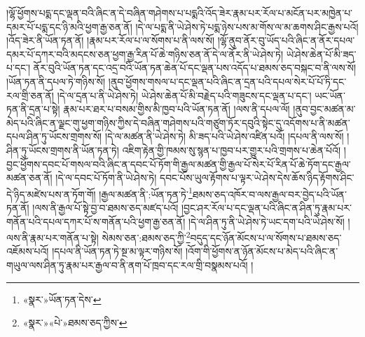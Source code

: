 །ལྷོ་ཕྱོགས་པདྨ་དང་ལྡན་བའི་ཞིང་ན་དེ་བཞིན་གཤེགས་པ་པདྨའི་འོད་ཟེར་རྣམ་པར་རོལ་པ་མངོན་པར་མཁྱེན་པ་དམར་པོ་པདྨ་དང་ཉི་མའི་ཕྱག་རྒྱ་ཅན་ནོ། །དེ་ལ་པདྨ་ནི་ཡེ་ཤེས་ཏེ་པདྨ་ཉེས་པས་མ་གོས་ལ་མ་ཆགས་ཤིང་རྒྱས་པའོ། །འོད་ཟེར་ནི་ཡོན་ཏན་ནོ། །རྣམ་པར་རོལ་པ་ལ་སོགས་པ་ནི་ལས་སོ། །ལྷོ་ནུབ་ནོར་བུ་ཡོད་པའི་ཞིང་ན་ནོར་དཔལ་དམར་པོ་དཀར་བའི་མདངས་ཅན་ཕྱག་རྒྱ་རིན་པོ་ཆེ་གཉིས་ཅན་ནོ་དེ་ལ་ནོར་ནི་ཡེ་ཤེས་ཏེ། ཡེ་ཤེས་ཆེན་པོ་མི་ཟད་པ་དང་། ནོར་བུའི་ཡོན་ཏན་དང་འདྲ་བའི་ཡོན་ཏན་ཆེན་པོ་དང་ལྡན་པས་འདོད་པ་ཐམས་ཅད་བསྐང་བ་ནི་ལས་སོ། །ཡོན་ཏན་ནི་དཔལ་ཏེ་གཉིས་སོ། །ནུབ་ཕྱོགས་གསལ་པ་དང་ལྡན་པའི་ཞིང་ན་དྲན་པའི་དཔལ་སེར་པོ་པོ་ཏི་དང་རལ་གྲི་ཅན་ནོ། །དེ་ལ་དྲན་པ་ནི་ཡེ་ཤེས་ཏེ། ཡེ་ཤེས་ཆེན་པོ་མི་བརྗེད་པའི་གཟུངས་དང་ལྡན་པ་དང་། ཡང་ཡོན་ཏན་ནི་དྲན་པ་སྟེ། རྣམ་པར་ཐར་པ་བསམ་གྱིས་མི་ཁྱབ་པའི་ཡོན་ཏན་ནོ། །ལས་ནི་དཔལ་ལོ། །ནུབ་བྱང་མཚན་མ་མེད་པའི་ཞིང་ན་ལྗང་གུ་ཕྱག་གཉིས་ཀྱིས་དེ་བཞིན་གཤེགས་པའི་གཙུག་ཏོར་དབུའི་སྟེང་དུ་འདོགས་པ་ནི་མཚན་དཔལ་ཤིན་ཏུ་ཡོངས་གྲགས་སོ། །དེ་ལ་མཚན་ནི་ཡེ་ཤེས་ཏེ། མི་ཟད་པའི་ཡེ་ཤེས་འཛིན་པའོ། །དཔལ་ནི་ལས་སོ། །ཤིན་ཏུ་ཡོངས་གྲགས་ནི་ཡོན་ཏན་ཏེ། འཇིག་རྟེན་གྱི་ཁམས་སུ་སྙན་པ་ཁྱབ་པར་གྱུར་པའི་གྲགས་པ་ཆེན་པོའོ། །བྱང་ཕྱོགས་དབང་པོ་གསལ་བའི་ཞིང་ན་དབང་པོ་ཏོག་གི་རྒྱལ་མཚན་གྱི་རྒྱལ་པོ་སེར་པོ་རིན་པོ་ཆེ་ཏོག་དང་རྒྱལ་མཚན་ཅན་ནོ། །དེ་ལ་དབང་པོ་ཏོག་ནི་ཡེ་ཤེས་ཏེ། དབང་པོས་ཡུལ་རྟོགས་པ་ལྟར་ཡེ་ཤེས་དེས་ཆོས་ཉིད་རྟོགས་ཤིང་དེ་ཉིད་མཛེས་པས་ན་ཏོག་གོ། །རྒྱལ་མཚན་ནི་:ཡོན་ཏན་ཏེ་\footnote{«སྣར་»ཡོན་ཏན་དེས་}ཐམས་ཅད་འཁོར་བ་ལས་རྒྱལ་བར་བྱེད་པའི་ཡོན་ཏན་ནོ། །ལས་ནི་རྒྱལ་པོ་སྟེ་བྱ་བ་ཐམས་ཅད་མཛད་པའོ། །བྱང་ཤར་རོལ་པ་དང་ལྡན་པའི་ཞིང་ན་ཤིན་ཏུ་རྣམ་པར་གནོན་པའི་དཔལ་དཀར་པོ་ས་གནོན་པའི་ཕྱག་རྒྱ་ཅན་ནོ། །དེ་ལ་ཤིན་ཏུ་ནི་ཡེ་ཤེས་ཏེ་ཡང་དག་པའི་ཡེ་ཤེས་སོ། །ལས་ནི་རྣམ་པར་གནོན་པ་སྟེ། སེམས་ཅན་:ཐམས་ཅད་ཀྱི་\footnote{«སྣར་»«པེ་»ཐམས་ཅད་ཀྱིས་}བདུད་དང་ཉོན་མོངས་པ་ལ་སོགས་པ་ཐམས་ཅད་འཇོམས་པའོ། །དཔལ་ནི་ཡོན་ཏན་ཏེ་སྔ་མ་ལྟར་གཉིས་སོ། །འོག་གི་ཕྱོགས་ན་ཉོན་མོངས་པ་མེད་པའི་ཞིང་ན་གཡུལ་ལས་ཤིན་ཏུ་རྣམ་པར་རྒྱལ་བ་ནི་ནག་པོ་ཁྲབ་དང་རལ་གྲི་བསྣམས་པའོ། །
